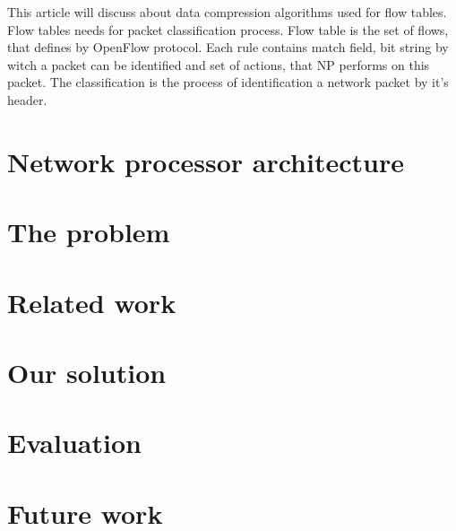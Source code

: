 \documentclass[conference]{IEEEtran}
\begin{document}
        This article will discuss about data compression algorithms used for flow tables. 
        Flow tables needs for packet classification process. Flow table is the set of flows, that defines
        by OpenFlow protocol. Each rule contains match field, bit string by witch a packet can be identified 
        and set of actions, that NP performs on this packet.
        The classification is the process of identification a network packet by it's header. 
        
    \section{Network processor architecture}
    \section{The problem}
    \section{Related work}
    \section{Our solution}
    \section{Evaluation}
    \section{Future work}
 \printbibliography{}
\end{document}
